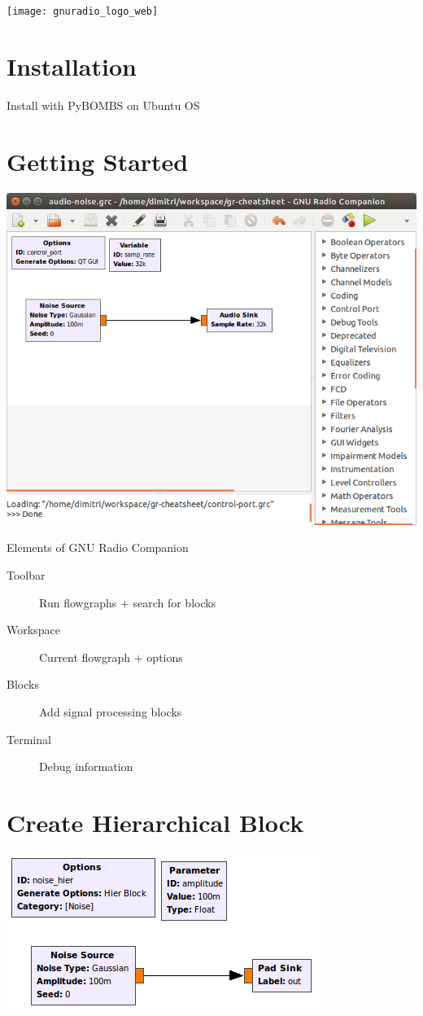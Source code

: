 \documentclass[10pt]{article}
\begin{document}
\texttt{[image: gnuradio\_logo\_web]}


\begin{multicols*}{3}


\section*{Installation}
Install with PyBOMBS on Ubuntu OS


\section*{Getting Started}

\includegraphics[width=0.99\linewidth]{./grc-screenshot}

Elements of GNU Radio Companion
\begin{description}
\item[Toolbar] Run flowgraphs + search for blocks
\item[Workspace] Current flowgraph + options
\item[Blocks] Add signal processing blocks
\item[Terminal] Debug information
\end{description}

\section*{Create Hierarchical Block}

\includegraphics[width=0.99\linewidth]{./noise-hier.png}


\end{multicols*}
\end{document}
